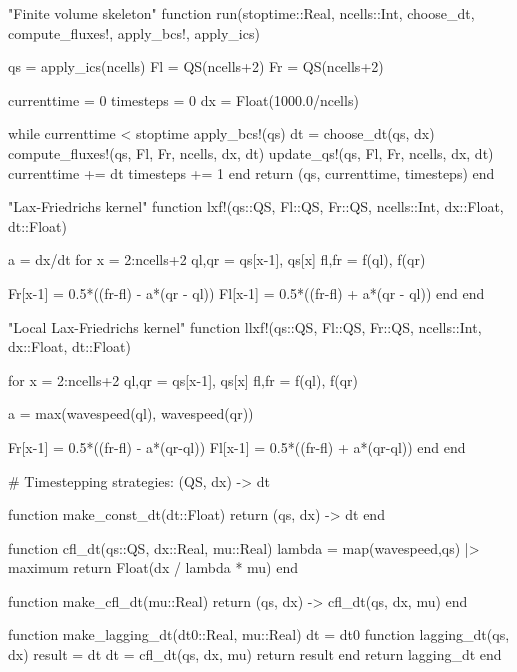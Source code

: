 \begin{myjulia}

"Finite volume skeleton"
function run(stoptime::Real, ncells::Int, choose_dt,
             compute_fluxes!, apply_bcs!, apply_ics)

    qs = apply_ics(ncells)
    Fl = QS(ncells+2)
    Fr = QS(ncells+2)

    currenttime = 0
    timesteps = 0
    dx = Float(1000.0/ncells)
    
    while currenttime < stoptime
        apply_bcs!(qs)
        dt = choose_dt(qs, dx)
        compute_fluxes!(qs, Fl, Fr, ncells, dx, dt)
        update_qs!(qs, Fl, Fr, ncells, dx, dt)
        currenttime += dt
        timesteps += 1
    end
    return (qs, currenttime, timesteps)
end

\end{myjulia}
\begin{myjulia}

"Lax-Friedrichs kernel"
function lxf!(qs::QS, Fl::QS, Fr::QS, 
              ncells::Int, dx::Float, dt::Float)
    
    a = dx/dt
    for x = 2:ncells+2
        ql,qr = qs[x-1], qs[x]
        fl,fr = f(ql), f(qr)        

        Fr[x-1] = 0.5*((fr-fl) - a*(qr - ql))
        Fl[x-1] = 0.5*((fr-fl) + a*(qr - ql))
    end
end

\end{myjulia}
\newpage
\begin{myjulia}

"Local Lax-Friedrichs kernel"
function llxf!(qs::QS, Fl::QS, Fr::QS, 
               ncells::Int, dx::Float, dt::Float)
    
    for x = 2:ncells+2
        ql,qr = qs[x-1], qs[x]
        fl,fr = f(ql), f(qr)

        a = max(wavespeed(ql), wavespeed(qr))

        Fr[x-1] = 0.5*((fr-fl) - a*(qr-ql))
        Fl[x-1] = 0.5*((fr-fl) + a*(qr-ql))
    end
end
\end{myjulia}
\begin{myjulia}
# Timestepping strategies: (QS, dx) -> dt

function make_const_dt(dt::Float)
    return (qs, dx) -> dt
end

function cfl_dt(qs::QS, dx::Real, mu::Real)
    lambda = map(wavespeed,qs) |> maximum
    return Float(dx / lambda * mu)
end

function make_cfl_dt(mu::Real)
    return (qs, dx) -> cfl_dt(qs, dx, mu)
end

function make_lagging_dt(dt0::Real, mu::Real)
    dt = dt0
    function lagging_dt(qs, dx)
        result = dt
        dt = cfl_dt(qs, dx, mu)
        return result
    end
    return lagging_dt
end
\end{myjulia}


